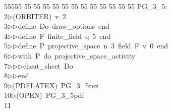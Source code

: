 %
%
\begin{tabbing}
55555 \= 55 \= 55 \= 55 \= 55 \= 55 \= 55 \= 55 \= 55 \= 55 \= 55 \= 55 \= 55 \= \>PG\_3\_5:\\[0pt]
2\>$\triangleright$\>(ORBITER)\ v\ 2\ \\[0pt]
3\>$\triangleright$\>$\triangleright$\>define\ Do\ draw\_options\ end\ \\[0pt]
4\>$\triangleright$\>$\triangleright$\>define\ F\ finite\_field\ q\ 5\ end\ \\[0pt]
5\>$\triangleright$\>$\triangleright$\>define\ P\ projective\_space\ n\ 3\ field\ F\ v\ 0\ end\ \\[0pt]
6\>$\triangleright$\>$\triangleright$\>with\ P\ do\ projective\_space\_activity\ \\[0pt]
7\>$\triangleright$\>$\triangleright$\>$\triangleright$\>cheat\_sheet\ Do\ \\[0pt]
8\>$\triangleright$\>$\triangleright$\>end\\[0pt]
9\>$\triangleright$\>(PDFLATEX)\ PG\_3\_5tex\ \\[0pt]
10\>$\triangleright$\>(OPEN)\ PG\_3\_5pdf\\[0pt]
11\>\end{tabbing}
